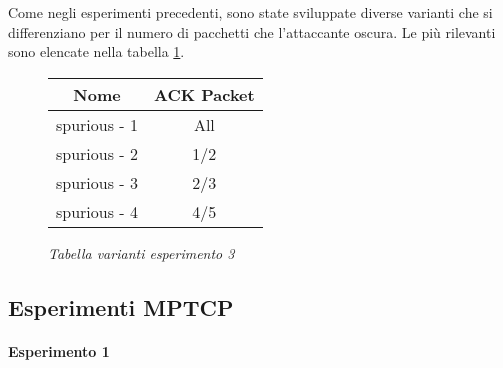 Come negli esperimenti precedenti, sono state sviluppate diverse varianti che si differenziano per il numero di pacchetti che l'attaccante oscura.
Le più rilevanti sono elencate nella tabella \ref{table-spurious}.
\begin{figure}[!h]
    \centering
    \begin{tabular}{|c|c|}
        \hline
        \textbf{Nome} & \textbf{ACK Packet} \\
        \hline
        spurious - 1  & All \\
        \hline
        spurious - 2 & 1/2 \\
        \hline
        spurious - 3 & 2/3 \\
        \hline
        spurious - 4 & 4/5 \\
        \hline
    \end{tabular}
    \caption{\emph{Tabella varianti esperimento 3}}
    \label{table-spurious}
\end{figure}
\subsection{Esperimenti MPTCP}
\paragraph{Esperimento 1}


